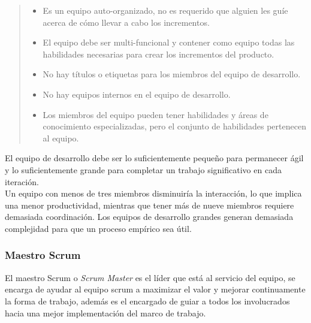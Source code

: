     \begin{quote}
    \begin{itemize}
        \item Es un equipo auto-organizado, no es requerido que alguien les guíe
              acerca de cómo llevar a cabo los incrementos.

        \item El equipo debe ser multi-funcional y contener como equipo todas las
              habilidades necesarias para crear los incrementos del producto.

        \item No hay títulos o etiquetas para los miembros del equipo de desarrollo.

        \item No hay equipos internos en el equipo de desarrollo.

        \item Los miembros del equipo pueden tener habilidades y áreas de conocimiento
              especializadas, pero el conjunto de habilidades pertenecen al equipo.
    \end{itemize}
    \end{quote}

 \noindent El equipo de desarrollo debe ser lo suficientemente pequeño para permanecer ágil y lo
 suficientemente grande para completar un trabajo significativo en cada iteración.\\

 \noindent Un equipo con menos de tres miembros disminuiría la interacción, lo que implica una
 menor productividad, mientras que tener más de nueve miembros requiere demasiada coordinación.
 Los equipos de desarrollo grandes generan demasiada complejidad para que un proceso empírico
 sea útil.

\clearpage

\subsubsection{Maestro Scrum}

 El maestro Scrum o {\it Scrum Master} es el líder que está al servicio del equipo,
 se encarga de ayudar al equipo scrum a maximizar el valor y mejorar continuamente la
 forma de trabajo, además es el encargado de guiar a todos los involucrados hacia una
 mejor implementación del marco de trabajo.

